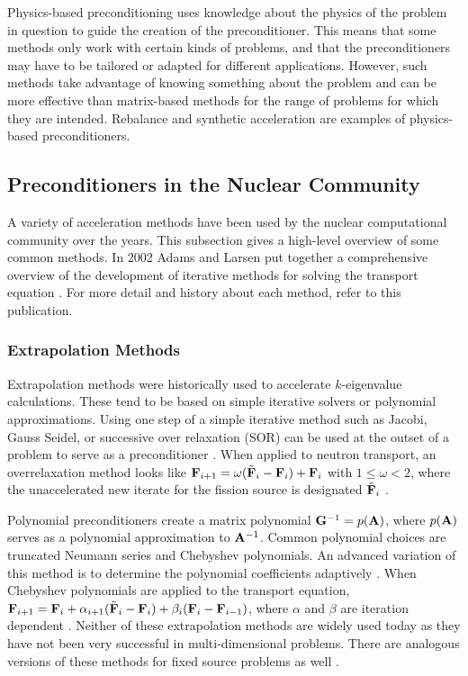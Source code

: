 Physics-based preconditioning uses knowledge about the physics of the problem in question to guide the creation of the preconditioner. This means that some methods only work with certain kinds of problems, and that the preconditioners may have to be tailored or adapted for different applications. However, such methods take advantage of knowing something about the problem and can be more effective than matrix-based methods for the range of problems for which they are intended. Rebalance and synthetic acceleration are examples of physics-based preconditioners.

\subsection{Preconditioners in the Nuclear Community}
A variety of acceleration methods have been used by the nuclear computational community over the years. This subsection gives a high-level overview of some common methods. In 2002 Adams and Larsen put together a comprehensive overview of the development of iterative methods for solving the \Sn transport equation \cite{Adams2002}. For more detail and history about each method, refer to this publication. 

\subsubsection{Extrapolation Methods}
Extrapolation methods were historically used to accelerate $k$-eigenvalue calculations. These tend to be based on simple iterative solvers or polynomial approximations. Using one step of a simple iterative method such as Jacobi, Gauss Seidel, or successive over relaxation (SOR) can be used at the outset of a problem to serve as a preconditioner \cite{Trefethen1997}. When applied to neutron transport, an overrelaxation method looks like $\mathbf{F}_{i+1} = \omega(\tilde{\mathbf{F}}_i - \mathbf{F}_i) + \mathbf{F}_i$ with $1 \le \omega < 2$, where the unaccelerated new iterate for the fission source is designated $\tilde{\mathbf{F}}_i$ \cite{Lewis1993}.

Polynomial preconditioners create a matrix polynomial $\mathbf{G}^{-1} = p(\mathbf{A})$, where $p(\mathbf{A})$ serves as a polynomial approximation to $\mathbf{A}^{-1}$. Common polynomial choices are truncated Neumann series and Chebyshev polynomials. An advanced variation of this method is to determine the polynomial coefficients adaptively \cite{Trefethen1997}. When Chebyshev polynomials are applied to the transport equation, $\mathbf{F}_{i+1} = \mathbf{F}_i + \alpha_{i+1}(\tilde{\mathbf{F}}_i - \mathbf{F}_i) + \beta_i(\mathbf{F}_i - \mathbf{F}_{i-1})$, where $\alpha$ and $\beta$ are iteration dependent \cite{Lewis1993}. Neither of these extrapolation methods are widely used today as they have not been very successful in multi-dimensional problems. There are analogous versions of these methods for fixed source problems as well \cite{Alcouffe1977}.  

